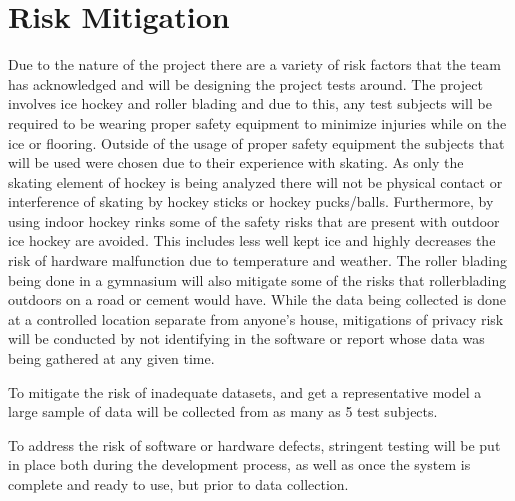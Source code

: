 \section{Risk Mitigation}
Due to the nature of the project there are a variety of risk factors that the team has acknowledged and will be designing the project tests around. The project involves ice hockey and roller blading and due to this, any test subjects will be required to be wearing proper safety equipment to minimize injuries while on the ice or flooring. Outside of the usage of proper safety equipment the subjects that will be used were chosen due to their experience with skating. As only the skating element of hockey is being analyzed there will not be physical contact or interference of skating by hockey sticks or hockey pucks/balls.  Furthermore, by using indoor hockey rinks some of the safety risks that are present with outdoor ice hockey are avoided. This includes less well kept ice and highly decreases the risk of hardware malfunction due to temperature and weather. The roller blading being done in a gymnasium will also mitigate some of the risks that rollerblading outdoors on a road or cement would have. While the data being collected is done at a controlled location separate from anyone’s house, mitigations of privacy risk will be conducted by not identifying in the software or report whose data was being gathered at any given time.

To mitigate the risk of inadequate datasets, and get a representative model a large sample of data will be collected from as many as 5 test subjects. 

To address the risk of software or hardware defects, stringent testing will be put in place both during the development process, as well as once the system is complete and ready to use, but prior to data collection.
